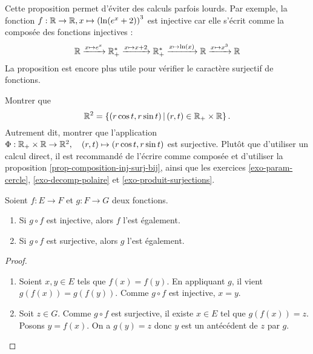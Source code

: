 \begin{exemple}
Cette proposition permet d'éviter des calculs parfois lourds. Par exemple, la fonction $f : \mathbb{R}\to \mathbb{R}, x\mapsto \left(\ln(e^x+2)\right)^3$ est injective car elle s'écrit comme la composée des fonctions injectives :
\[ \mathbb{R} \xrightarrow{x\mapsto e^x} \mathbb{R}_+^* \xrightarrow{x\mapsto x+2} \mathbb{R}_+^* \xrightarrow{x\mapsto \ln(x)} \mathbb{R} \xrightarrow{x\mapsto x^3}\mathbb{R}\]
La proposition est encore plus utile pour vérifier le caractère surjectif de fonctions.
\end{exemple}

\begin{exercice}\label{exo-coord-polaires-plan}
Montrer que 
\[\R^2 = \ensemble{(r\cos t, r\sin t)}{(r,t) \in \R_+\times \R}.\]
Autrement dit, montrer que l'application $\Phi : \mathbb{R}_+\times \mathbb{R} \to \mathbb{R}^2, \quad (r,t) \mapsto (r\cos t, r\sin t)$ est surjective. Plutôt que d'utiliser un calcul direct, il est recommandé de l'écrire comme composée et d'utiliser la proposition \ref{prop-composition-inj-surj-bij}, ainsi que les exercices \ref{exo-param-cercle}, \ref{exo-decomp-polaire}  et \ref{exo-produit-surjections}.
\end{exercice}



\begin{proposition}
Soient $f : E\to F$ et $g : F\to G$ deux fonctions.
\begin{enumerate}
\item Si $g\circ f$ est injective, alors $f$ l'est également.
\item Si $g\circ f$ est surjective, alors $g$ l'est également.
\end{enumerate}
\end{proposition}
\begin{proof}
\begin{enumerate}
\item Soient $x, y\in E$ tels que $f(x)=f(y)$. En appliquant $g$, il vient $g(f(x))=g(f(y))$. Comme $g\circ f$ est injective, $x=y$.
\item Soit $z\in G$. Comme $g\circ f$ est surjective, il existe $x\in E$ tel que $g(f(x))=z$. Posons $y = f(x)$. On a $g(y)=z$ donc $y$ est un antécédent de $z$ par $g$.
\end{enumerate}
\end{proof}




